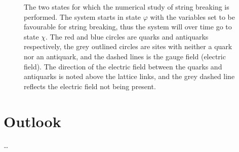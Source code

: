 \documentclass[../main.tex]{subfiles} %
\begin{document}
\begin{figure}[t]
    \caption{The two states for which the numerical study of string breaking is performed. The system starts in state $\varphi$ with the variables set to be favourable for string breaking, thus the system will over time go to state $\chi$. The red and blue circles are quarks and antiquarks respectively, the grey outlined circles are sites with neither a quark nor an antiquark, and the dashed lines is the gauge field (electric field). The direction of the electric field between the quarks and antiquarks is noted above the lattice links, and the grey dashed line reflects the electric field not being present.}
    \label{fig:SystemForNumericalSimulationOfConfinementAndStringBreaking}
\end{figure}




\section{Outlook} \label{sec:Outlook}

\ldots
\end{document}
